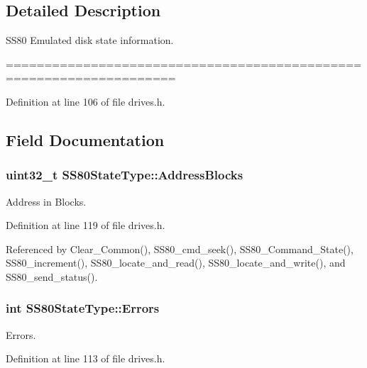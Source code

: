 \subsection{Detailed Description}
S\+S80 Emulated disk state information. 

==================================================================== 

Definition at line 106 of file drives.\+h.



\subsection{Field Documentation}
\subsubsection[{\texorpdfstring{Address\+Blocks}{AddressBlocks}}]{\setlength{\rightskip}{0pt plus 5cm}uint32\+\_\+t S\+S80\+State\+Type\+::\+Address\+Blocks}\hypertarget{structSS80StateType_a6cffa1e36a57bce4188ede4bd9dbd7ad}{}\label{structSS80StateType_a6cffa1e36a57bce4188ede4bd9dbd7ad}


Address in Blocks. 



Definition at line 119 of file drives.\+h.



Referenced by Clear\+\_\+\+Common(), S\+S80\+\_\+cmd\+\_\+seek(), S\+S80\+\_\+\+Command\+\_\+\+State(), S\+S80\+\_\+increment(), S\+S80\+\_\+locate\+\_\+and\+\_\+read(), S\+S80\+\_\+locate\+\_\+and\+\_\+write(), and S\+S80\+\_\+send\+\_\+status().

\subsubsection[{\texorpdfstring{Errors}{Errors}}]{\setlength{\rightskip}{0pt plus 5cm}int S\+S80\+State\+Type\+::\+Errors}\hypertarget{structSS80StateType_a7a5c363c6f617ee457a4daacadb3a7b2}{}\label{structSS80StateType_a7a5c363c6f617ee457a4daacadb3a7b2}


Errors. 



Definition at line 113 of file drives.\+h.



